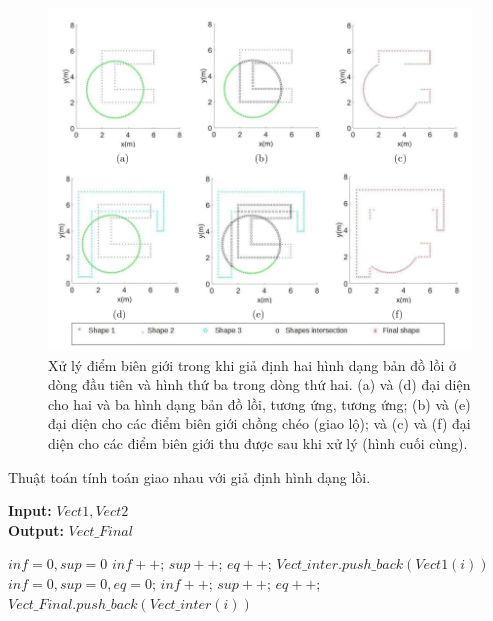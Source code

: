 \documentclass[11pt,openany]{book}
\begin{document}
\begin{figure}[H]
    \centering
    \includegraphics[scale=0.4]{assets/3_6.png}
    \caption{Xử lý điểm biên giới trong khi giả định hai hình dạng bản đồ lồi ở dòng đầu tiên và hình thứ ba trong dòng thứ hai. (a) và (d) đại diện cho hai và ba hình dạng bản đồ lồi, tương ứng, tương ứng; (b) và (e) đại diện cho các điểm biên giới chồng chéo (giao lộ); và (c) và (f) đại diện cho các điểm biên giới thu được sau khi xử lý (hình cuối cùng).}
    \label{fig:3.6}
\end{figure}
\begin{algorithm}[H]
    \caption{Thuật toán tính toán giao nhau với giả định hình dạng lồi.}
    \label{alg:3.4}
    \hspace*{\algorithmicindent} \textbf{Input:} $Vect1, Vect2$ \\
    \hspace*{\algorithmicindent} \textbf{Output:} $Vect\_Final$
    \begin{algorithmic}[1]
        \STATE $inf = 0, sup = 0$
        \STATE $inf++$;
        \STATE $sup++$;
        \ELSE
        \STATE $eq++$;
        \ENDIF
        \ENDFOR
        \STATE $Vect\_inter.push\_back(Vect1(i))$
        \ENDIF
        \ENDFOR
        \STATE $inf=0,sup=0, eq=0$;
        \STATE $inf++$;
        \STATE $sup++$;
        \ELSE
        \STATE $eq++$;
        \ENDIF
        \ENDIF
        \ENDFOR
        \STATE $Vect\_Final.push\_back(Vect\_inter(i))$
        \ENDIF
        \ENDFOR
    \end{algorithmic}
\end{algorithm}
\end{document}
